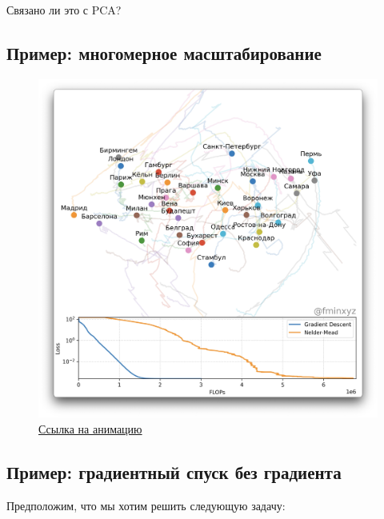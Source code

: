 \documentclass[
  russian,
  letterpaper,
  DIV=11,
  numbers=noendperiod]{scrartcl}
\begin{document}
\begin{tcolorbox}[enhanced jigsaw, colbacktitle=quarto-callout-color!10!white, toptitle=1mm, bottomrule=.15mm, left=2mm, opacitybacktitle=0.6, colframe=quarto-callout-color-frame, arc=.35mm, bottomtitle=1mm, colback=white, coltitle=black, title=\textcolor{quarto-callout-color}{\faInfo}\hspace{0.5em}{Question}, leftrule=.75mm, opacityback=0, rightrule=.15mm, toprule=.15mm, breakable, titlerule=0mm]

Связано ли это с PCA?

\end{tcolorbox}

\subsection{Пример: многомерное
масштабирование}\label{ux43fux440ux438ux43cux435ux440-ux43cux43dux43eux433ux43eux43cux435ux440ux43dux43eux435-ux43cux430ux441ux448ux442ux430ux431ux438ux440ux43eux432ux430ux43dux438ux435-1}

\begin{figure}[H]

{\centering \includegraphics[width=0.4\linewidth,height=\textheight,keepaspectratio]{mds.png}

}

\caption{\href{https://fmin.xyz/docs/visualizations/mds.mp4}{Ссылка на
анимацию}}

\end{figure}%

\subsection{Пример: градиентный спуск без
градиента}\label{ux43fux440ux438ux43cux435ux440-ux433ux440ux430ux434ux438ux435ux43dux442ux43dux44bux439-ux441ux43fux443ux441ux43a-ux431ux435ux437-ux433ux440ux430ux434ux438ux435ux43dux442ux430}

Предположим, что мы хотим решить следующую задачу:
\end{document}
